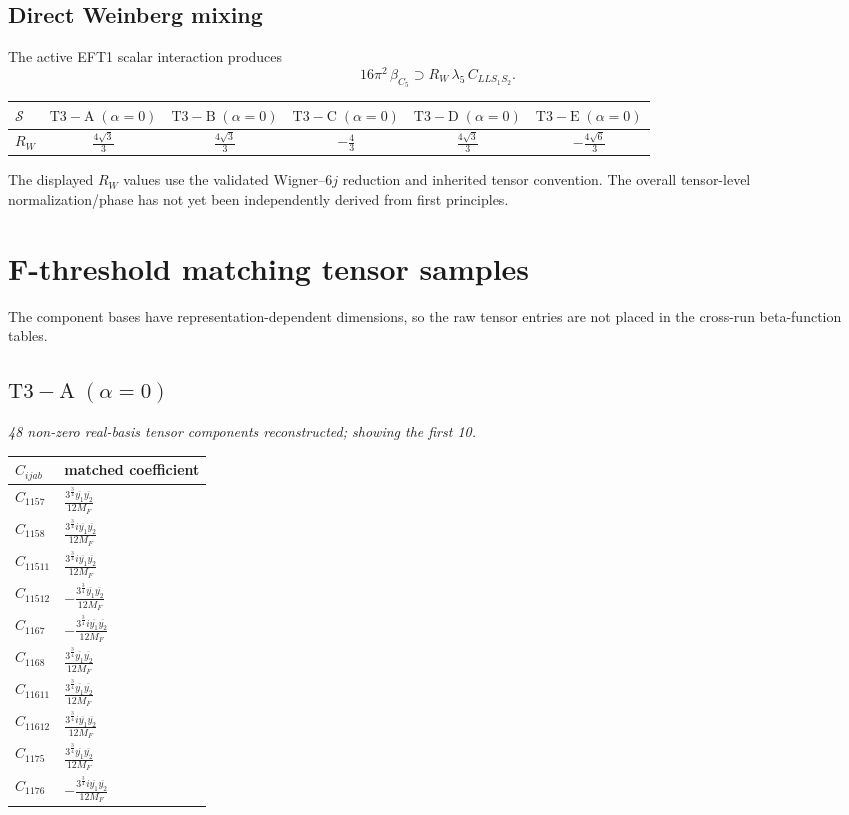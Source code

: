 \documentclass[9pt]{article}
\begin{document}
\subsection*{Direct Weinberg mixing}
The active EFT1 scalar interaction produces
\[16\pi^2\,\beta_{C_5}\supset R_W\,\lambda_5\,C_{LLS_1S_2}.\]
\begin{longtable}{@{}lccccc@{}}
\toprule
$\mathcal{S}$ & $ \mathrm{T3-A}\;(\alpha=0) $ & $ \mathrm{T3-B}\;(\alpha=0) $ & $ \mathrm{T3-C}\;(\alpha=0) $ & $ \mathrm{T3-D}\;(\alpha=0) $ & $ \mathrm{T3-E}\;(\alpha=0) $ \\
\midrule
$R_W$ & $ \frac{4 \sqrt{3}}{3} $ & $ \frac{4 \sqrt{3}}{3} $ & $ - \frac{4}{3} $ & $ \frac{4 \sqrt{3}}{3} $ & $ - \frac{4 \sqrt{6}}{3} $ \\
\bottomrule
\end{longtable}
The displayed $R_W$ values use the validated Wigner--$6j$ reduction and inherited tensor convention.  The overall tensor-level normalization/phase has not yet been independently derived from first principles.
\section*{F-threshold matching tensor samples}
The component bases have representation-dependent dimensions, so the raw tensor entries are not placed in the cross-run beta-function tables.
\subsection*{$ \mathrm{T3-A}\;(\alpha=0) $}
\textit{48 non-zero real-basis tensor components reconstructed; showing the first 10.}
\begin{longtable}{@{}ll@{}}
\toprule
$C_{ijab}$ & matched coefficient \\
\midrule
$C_{1157}$ & $ \frac{3^{\frac{3}{4}} \overline{y_{1}} \overline{y_{2}}}{12 M_F} $ \\
$C_{1158}$ & $ \frac{3^{\frac{3}{4}} i \overline{y_{1}} \overline{y_{2}}}{12 M_F} $ \\
$C_{11511}$ & $ \frac{3^{\frac{3}{4}} i \overline{y_{1}} \overline{y_{2}}}{12 M_F} $ \\
$C_{11512}$ & $ - \frac{3^{\frac{3}{4}} \overline{y_{1}} \overline{y_{2}}}{12 M_F} $ \\
$C_{1167}$ & $ - \frac{3^{\frac{3}{4}} i \overline{y_{1}} \overline{y_{2}}}{12 M_F} $ \\
$C_{1168}$ & $ \frac{3^{\frac{3}{4}} \overline{y_{1}} \overline{y_{2}}}{12 M_F} $ \\
$C_{11611}$ & $ \frac{3^{\frac{3}{4}} \overline{y_{1}} \overline{y_{2}}}{12 M_F} $ \\
$C_{11612}$ & $ \frac{3^{\frac{3}{4}} i \overline{y_{1}} \overline{y_{2}}}{12 M_F} $ \\
$C_{1175}$ & $ \frac{3^{\frac{3}{4}} \overline{y_{1}} \overline{y_{2}}}{12 M_F} $ \\
$C_{1176}$ & $ - \frac{3^{\frac{3}{4}} i \overline{y_{1}} \overline{y_{2}}}{12 M_F} $ \\
\bottomrule
\end{longtable}
\end{document}
